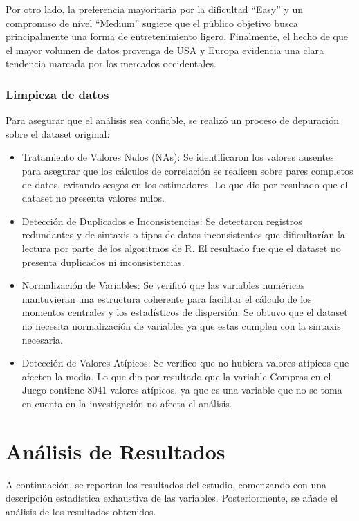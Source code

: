 \documentclass[oneside,11pt]{Latex/Classes/PhDthesisPSnPDF}
\begin{document}
Por otro lado, la preferencia mayoritaria por la dificultad ``Easy'' y
un compromiso de nivel ``Medium'' sugiere que el público objetivo busca
principalmente una forma de entretenimiento ligero. Finalmente, el hecho
de que el mayor volumen de datos provenga de USA y Europa evidencia una
clara tendencia marcada por los mercados occidentales.

\subsection{Limpieza de datos}

Para asegurar que el análisis sea confiable, se realizó un proceso de
depuración sobre el dataset original:

\begin{itemize}
  \item{Tratamiento de Valores Nulos (NAs): Se identificaron los valores ausentes para asegurar que los cálculos de correlación se realicen sobre pares completos de datos, evitando sesgos en los estimadores. Lo que dio por resultado que el dataset no presenta valores nulos.} 
  \item{Detección de Duplicados e Inconsistencias: Se detectaron registros redundantes y de sintaxis o tipos de datos inconsistentes que dificultarían la lectura por parte de los algoritmos de R. El resultado fue que el dataset no presenta duplicados ni inconsistencias.} 
  \item{Normalización de Variables: Se verificó que las variables numéricas mantuvieran una estructura coherente para facilitar el cálculo de los momentos centrales y los estadísticos de dispersión. Se obtuvo que el dataset no necesita normalización de variables ya que estas cumplen con la sintaxis necesaria.}
  \item{Detección de Valores Atípicos: Se verifico que no hubiera valores atípicos que afecten la media. Lo que dio por resultado que la variable Compras en el Juego contiene 8041 valores atípicos, ya que es una variable que no se toma en cuenta en la investigación no afecta el análisis.}
\end{itemize}

\chapter{Análisis de Resultados}

A continuación, se reportan los resultados del estudio, comenzando con
una descripción estadística exhaustiva de las variables. Posteriormente,
se añade el análisis de los resultados obtenidos.
\end{document}
